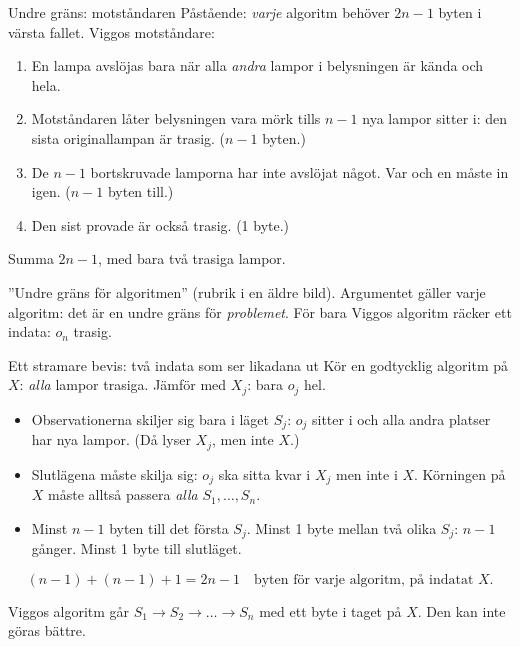 \begin{frame}{Undre gräns: motståndaren}
\small
Påstående: \emph{varje} algoritm behöver $2n-1$ byten i värsta fallet. Viggos motståndare:
\begin{enumerate}\setlength{\itemsep}{3pt}
  \item En lampa avslöjas bara när alla \emph{andra} lampor i belysningen är kända och hela.
  \item Motståndaren låter belysningen vara mörk tills $n-1$ nya lampor sitter i: den sista
        originallampan är trasig. ($n-1$ byten.)
  \item De $n-1$ bortskruvade lamporna har inte avslöjat något. Var och en måste in igen.
        ($n-1$ byten till.)
  \item Den sist provade är också trasig. (1 byte.)
\end{enumerate}
Summa $2n-1$, med bara två trasiga lampor.
\vfill
\begin{missbox}[fontupper=\footnotesize]
”Undre gräns för algoritmen” (rubrik i en äldre bild). Argumentet gäller varje algoritm: det är en
undre gräns för \emph{problemet}. För bara Viggos algoritm räcker ett indata: $o_n$ trasig.
\end{missbox}
\end{frame}

{\kaninbg
\begin{frame}{\kh Ett stramare bevis: två indata som ser likadana ut}
\small
Kör en godtycklig algoritm på $X$: \emph{alla} lampor trasiga. Jämför med $X_j$: bara $o_j$ hel.
\begin{itemize}\setlength{\itemsep}{3pt}
  \item Observationerna skiljer sig bara i läget $S_j$: $o_j$ sitter i och alla andra platser har
        nya lampor. (Då lyser $X_j$, men inte $X$.)
  \item Slutlägena måste skilja sig: $o_j$ ska sitta kvar i $X_j$ men inte i $X$. Körningen på $X$
        måste alltså passera \emph{alla} $S_1,\dots,S_n$.
  \item Minst $n-1$ byten till det första $S_j$. Minst 1 byte mellan två olika $S_j$: $n-1$ gånger.
        Minst 1 byte till slutläget.
\end{itemize}
\[
  (n-1)+(n-1)+1=2n-1\quad\text{byten för varje algoritm, på indatat }X.
\]
\vfill
\begin{kaninbox}[fontupper=\footnotesize]
Viggos algoritm går $S_1\to S_2\to\dots\to S_n$ med ett byte i taget på $X$. Den kan inte göras bättre.
\end{kaninbox}
\end{frame}}

